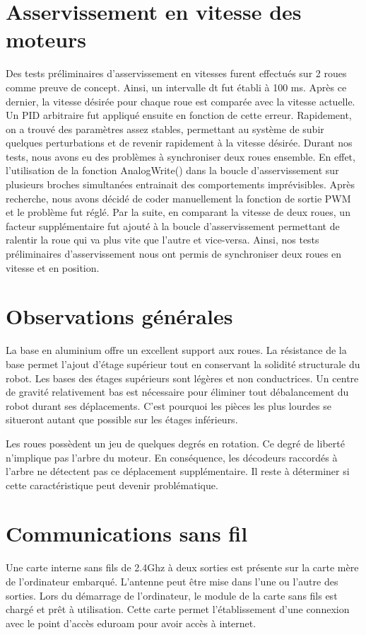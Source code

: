 \section{Asservissement en vitesse des moteurs}

Des tests préliminaires d'asservissement en vitesses furent effectués sur 2 roues comme preuve de concept. Ainsi, un intervalle dt fut établi à 100 ms.
Après ce dernier, la vitesse désirée pour chaque roue est comparée avec la vitesse actuelle. Un PID arbitraire fut appliqué ensuite en fonction de cette erreur.
Rapidement, on a trouvé des paramètres assez stables, permettant au système de subir quelques perturbations et de revenir rapidement à la vitesse désirée.
Durant nos tests, nous avons eu des problèmes à synchroniser deux roues ensemble. En effet, l'utilisation de la fonction AnalogWrite() dans la boucle d'asservissement
sur plusieurs broches simultanées entrainait des comportements imprévisibles. Après recherche, nous avons décidé de coder manuellement la fonction de sortie PWM et le
problème fut réglé. Par la suite, en comparant la vitesse de deux roues, un facteur supplémentaire fut ajouté à la boucle d'asservissement permettant de ralentir la roue
qui va plus vite que l'autre et vice-versa. Ainsi, nos tests préliminaires d'asservissement nous ont permis de synchroniser deux roues en vitesse et en position.

\section{Observations générales}
La base en aluminium offre un excellent support aux roues. La résistance de la base permet l'ajout d'étage supérieur tout en conservant la solidité
structurale du robot. Les bases des étages supérieurs sont légères et non conductrices. Un centre de gravité relativement bas est nécessaire pour éliminer
tout débalancement du robot durant ses déplacements. C'est pourquoi les pièces les plus lourdes se situeront autant que possible sur les étages inférieurs.

Les roues possèdent un jeu de quelques degrés en rotation. Ce degré de liberté n'implique pas l'arbre du moteur. En conséquence, les décodeurs raccordés
à l'arbre ne détectent pas ce déplacement supplémentaire. Il reste à déterminer si cette caractéristique peut devenir problématique.

\section{Communications sans fil}
Une carte interne sans fils de 2.4Ghz à deux sorties est présente sur la carte mère de l'ordinateur embarqué. L'antenne peut être mise dans l'une ou l'autre des sorties.
Lors du démarrage de l'ordinateur, le module de la carte sans fils est chargé et prêt à utilisation. Cette carte permet l'établissement d'une connexion avec le point d'accès
eduroam pour avoir accès à internet.

